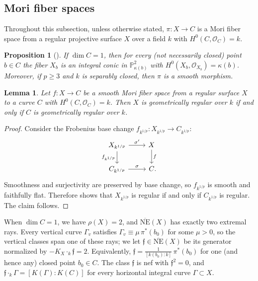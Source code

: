\documentclass[reqno,oneside]{amsart}
\newtheorem{lemma}[theorem]{Lemma}
\newtheorem{proposition}[theorem]{Proposition}
\theoremstyle{definition}
\theoremstyle{plain}
\numberwithin{equation}{section}
\begin{document}
\subsection{Mori fiber spaces}\label{subsection-Mori-fiber-spaces}
Throughout this subsection, unless otherwise stated, $\pi\colon X\to C$ is a Mori fiber space from a regular projective surface $X$ over a field $k$ with $H^0(C,\mathcal{O}_C)=k$.
\begin{proposition}[{\cite[Proposition~2.18]{Bernasconi-Tanaka-22}}]\label{proposition-BT22-2.18}%
  If $\dim C = 1$, then for every (not necessarily closed) point $b\in C$ the fiber $X_b$ is an integral conic in $\mathbb P^2_{\kappa(b)}$ with $H^0(X_b,\mathcal{O}_{X_b})=\kappa(b)$.
  Moreover, if $p\ge3$ and $k$ is separably closed, then $\pi$ is a smooth morphism.
\end{proposition}

\begin{lemma}\label{lemma-MFS-geo-regular-base}
  Let $f\colon X\to C$ be a smooth Mori fiber space from a regular surface $X$ to a curve $C$ with $H^0(C,\mathcal O_C) = k$.
  Then $X$ is geometrically regular over $k$ if and only if $C$ is geometrically regular over $k$.
\end{lemma}
\begin{proof}
  Consider the Frobenius base change $f_{k^{1/p}}\colon X_{k^{1/p}}\to C_{k^{1/p}}$:
  \[
    \begin{tikzcd}
      X_{k^{1/p}} \rar{\sigma'} \dar[swap]{f_{k^{1/p}}} & X \dar{f} \\ C_{k^{1/p}} \rar{\sigma} & C \rlap{.}
    \end{tikzcd}
  \]
  Smoothness and surjectivity are preserved by base change, so $f_{k^{1/p}}$ is smooth and faithfully flat.
  Therefore \cite[Theorem~23.7]{MatsumuraCRT} shows that $X_{k^{1/p}}$ is regular if and only if $C_{k^{1/p}}$ is regular.
  The claim follows.
\end{proof}

  When $\dim C = 1$, we have $\rho(X)=2$, and $\overline{\mathrm{NE}}(X)$ has exactly two extremal rays.
Every vertical curve $\Gamma_v$ satisfies $\Gamma_v\equiv\mu\,\pi^*(b_0)$ for some $\mu>0$, so the vertical classes span one of these rays; we let $\mathfrak{f}\in\overline{\mathrm{NE}}(X)$ be its generator normalized by $-K_X\cdot_k \mathfrak{f}=2$.
Equivalently, $\mathfrak{f} = \tfrac{1}{[k(b_0):k]}\,\pi^*(b_0)$ for one (and hence any) closed point $b_0\in C$.
The class $\mathfrak{f}$ is nef with $\mathfrak{f}^2=0$, and $\mathfrak{f}\cdot_k\Gamma=[K(\Gamma):K(C)]$ for every horizontal integral curve $\Gamma\subset X$.
\end{document}
